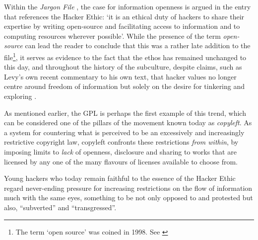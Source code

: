 Within the \textit{Jargon File} \citep[p.334]{raymond93}, the case for information openness is argued in the entry that references the Hacker Ethic: `it is an ethical duty of hackers to share their expertise by writing open-source and facilitating access to information and to computing resources wherever possible'. While the presence of the term \textit{open-source} can lead the reader to conclude that this was a rather late addition to the file\footnote{The term `open source' was coined in 1998. See \citet{osi12}}, it serves as evidence to the fact that the ethos has remained unchanged to this day, and throughout the history of the subculture, despite claims, such as Levy's own recent commentary to his own text, that hacker values no longer centre around freedom of information but solely on the desire for tinkering and exploring \citep{levy10}.

As mentioned earlier, the GPL is perhaps the first example of this trend, which can be considered one of the pillars of the movement known today as \textit{copyleft}. As a system for countering what is perceived to be an excessively and increasingly restrictive copyright law, copyleft confronts these restrictions \emph{from within}, by imposing limits to \emph{lack} of openness, disclosure and sharing to works that are licensed by any one of the many flavours of licenses available to choose from.

Young hackers who today remain faithful to the essence of the Hacker Ethic regard never-ending pressure for increasing restrictions on the flow of information much with the same eyes, something to be not only opposed to and protested but also, ``subverted'' and ``transgressed''.






